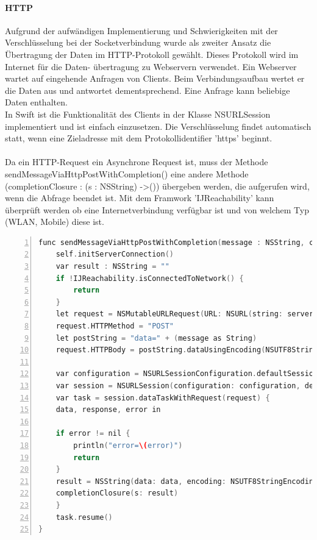 \paragraph{HTTP}
Aufgrund der aufwändigen Implementierung und Schwierigkeiten mit der Verschlüsselung bei der Socketverbindung wurde als zweiter Ansatz die Übertragung der Daten im HTTP-Protokoll gewählt. Dieses Protokoll wird im Internet für die Daten- übertragung zu Webservern verwendet. Ein Webserver wartet auf eingehende Anfragen von Clients. Beim Verbindungsaufbau wertet er die Daten aus und antwortet dementsprechend. Eine Anfrage kann beliebige Daten enthalten. \\
In Swift ist die Funktionalität des Clients in der Klasse NSURLSession implementiert und ist einfach einzusetzen. Die Verschlüsselung findet automatisch statt, wenn eine Zieladresse mit dem Protokollidentifier 'https' beginnt.\\\\
Da ein HTTP-Request ein Asynchrone Request ist, muss der Methode sendMessageViaHttpPostWithCompletion() eine andere Methode (completionClosure : (s : NSString) -\textgreater ()) übergeben werden, die aufgerufen wird, wenn die Abfrage beendet ist. Mit dem Framwork 'IJReachability' kann überprüft werden ob eine Internetverbindung verfügbar ist und von welchem Typ (WLAN, Mobile) diese ist. 

\begin{lstlisting}[caption =Implementierung HTTP-Request in Swift, language=C++, frame=single, breaklines=true,columns=fullflexible, commentstyle=\color{gray}\upshape, captionpos=b, numbers = left]
func sendMessageViaHttpPostWithCompletion(message : NSString, completionClosure : (s : NSString) -> ()) {
    self.initServerConnection()
    var result : NSString = ""
    if !IJReachability.isConnectedToNetwork() {
	    return
    }
    let request = NSMutableURLRequest(URL: NSURL(string: server)!)
    request.HTTPMethod = "POST"
    let postString = "data=" + (message as String)
    request.HTTPBody = postString.dataUsingEncoding(NSUTF8StringEncoding)
    
    var configuration = NSURLSessionConfiguration.defaultSessionConfiguration()
    var session = NSURLSession(configuration: configuration, delegate: self, delegateQueue: NSOperationQueue.mainQueue())
    var task = session.dataTaskWithRequest(request) {
    data, response, error in
    
    if error != nil {
	    println("error=\(error)")
	    return
	}
    result = NSString(data: data, encoding: NSUTF8StringEncoding)!
    completionClosure(s: result)
    }
    task.resume()
}
\end{lstlisting}

